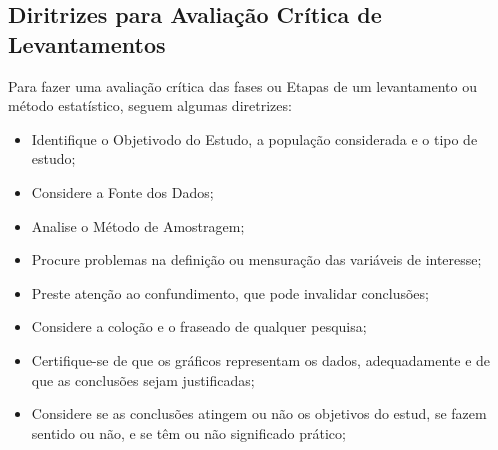 \newpage
\subsection{Diritrizes para Avaliação Crítica de Levantamentos}

\inic Para  fazer uma avaliação crítica das fases ou Etapas de um levantamento ou método estatístico, seguem algumas diretrizes:

\begin{itemize}
    \item Identifique o Objetivodo do Estudo, a população considerada e o tipo de estudo;
    \item Considere a Fonte dos Dados;
    \item Analise o Método de Amostragem;
    \item Procure problemas na definição ou mensuração das variáveis de interesse;
    \item Preste atenção ao confundimento, que pode invalidar conclusões;
    \item Considere a coloção e o fraseado de qualquer pesquisa;
    \item Certifique-se de que os gráficos representam os dados, adequadamente e de que as conclusões sejam justificadas;
    \item Considere se as conclusões atingem ou não os objetivos do estud, se fazem sentido ou não, e se têm ou não significado prático;
\end{itemize}








